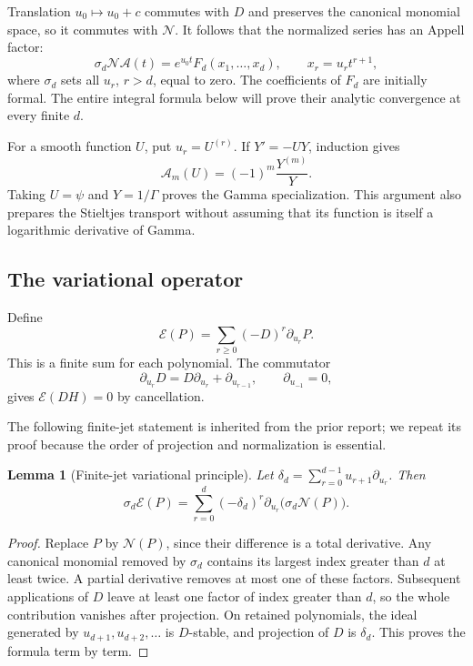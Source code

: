 \documentclass[11pt,letterpaper]{article}
\numberwithin{equation}{section}
\theoremstyle{plain}
\newtheorem{lemma}[theorem]{Lemma}
\theoremstyle{definition}
\theoremstyle{remark}
\newcommand{\Ac}{\mathcal A}\newcommand{\Nc}{\mathcal N}\newcommand{\Hc}{\mathcal H}
\newcommand{\Ec}{\mathscr E}\newcommand{\dd}{\,\mathrm d}
\begin{document}
Translation $u_0\mapsto u_0+c$ commutes with $D$ and preserves the canonical monomial space, so it commutes with $\Nc$. It follows that the normalized series has an Appell factor:
\begin{equation}\label{eq:appell}
 \sigma_d\Nc\Ac(t)=e^{u_0t}F_d(x_1,\ldots,x_d),
 \qquad x_r=u_rt^{r+1},
\end{equation}
where $\sigma_d$ sets all $u_r$, $r>d$, equal to zero. The coefficients of $F_d$ are initially formal. The entire integral formula below will prove their analytic convergence at every finite $d$.

For a smooth function $U$, put $u_r=U^{(r)}$. If $Y'=-UY$, induction gives
\begin{equation}\label{eq:YBell}
 \Ac_m(U)=(-1)^m\frac{Y^{(m)}}{Y}.
\end{equation}
Taking $U=\psi$ and $Y=1/\Gamma$ proves the Gamma specialization. This argument also prepares the Stieltjes transport without assuming that its function is itself a logarithmic derivative of Gamma.

\subsection{The variational operator}

Define
\begin{equation}\label{eq:Euler}
 \Ec(P)=\sum_{r\ge0}(-D)^r\partial_{u_r}P.
\end{equation}
This is a finite sum for each polynomial. The commutator
\[
 \partial_{u_r}D=D\partial_{u_r}+\partial_{u_{r-1}},
 \qquad \partial_{u_{-1}}=0,
\]
gives $\Ec(DH)=0$ by cancellation.

The following finite-jet statement is inherited from the prior report; we repeat its proof because the order of projection and normalization is essential.

\begin{lemma}[Finite-jet variational principle]\label{lem:finitejet}
Let $\delta_d=\sum_{r=0}^{d-1}u_{r+1}\partial_{u_r}$. Then
\begin{equation}\label{eq:finitejet}
 \sigma_d\Ec(P)=\sum_{r=0}^d(-\delta_d)^r
                 \partial_{u_r}\bigl(\sigma_d\Nc(P)\bigr).
\end{equation}
\end{lemma}
\begin{proof}
Replace $P$ by $\Nc(P)$, since their difference is a total derivative. Any canonical monomial removed by $\sigma_d$ contains its largest index greater than $d$ at least twice. A partial derivative removes at most one of these factors. Subsequent applications of $D$ leave at least one factor of index greater than $d$, so the whole contribution vanishes after projection. On retained polynomials, the ideal generated by $u_{d+1},u_{d+2},\ldots$ is $D$-stable, and projection of $D$ is $\delta_d$. This proves the formula term by term.
\end{proof}
\end{document}
